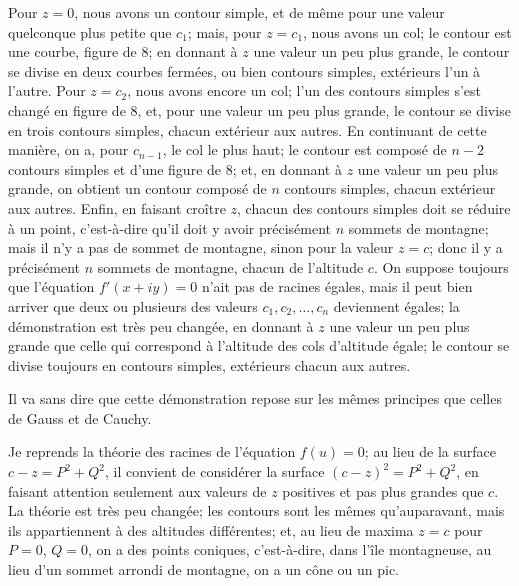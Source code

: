 \documentclass[11pt,a4paper]{article}
\begin{document}
Pour $z = 0$, nous avons un contour simple, et de même pour une valeur quelconque plus petite que $c_1$; mais, pour $z = c_1$, nous avons un col; le contour est une courbe, figure de 8; en donnant à $z$ une valeur un peu plus grande, le contour se divise en deux courbes fermées, ou bien contours simples, extérieurs l'un à l'autre. Pour $z = c_2$, nous avons encore un col; l'un des contours simples s'est changé en figure de 8, et, pour une valeur un peu plus grande, le contour se divise en trois contours simples, chacun extérieur aux autres. En continuant de cette manière, on a, pour $c_{n-1}$, le col le plus haut; le contour est composé de $n - 2$ contours simples et d'une figure de 8; et, en donnant à $z$ une valeur un peu plus grande, on obtient un contour composé de $n$ contours simples, chacun extérieur aux autres. Enfin, en faisant croître $z$, chacun des contours simples doit se réduire à un point, c'est-à-dire qu'il doit y avoir précisément $n$ sommets de montagne; mais il n'y a pas de sommet de montagne, sinon pour la valeur $z = c$; donc il y a précisément $n$ sommets de montagne, chacun de l'altitude $c$. On suppose toujours que l'équation $f'(x + iy) = 0$ n'ait pas de racines égales, mais il peut bien arriver que deux ou plusieurs des valeurs $c_1, c_2, \ldots, c_n$ deviennent égales; la démonstration est très peu changée, en donnant à $z$ une valeur un peu plus grande que celle qui correspond à l'altitude des cols d'altitude égale; le contour se divise toujours en contours simples, extérieurs chacun aux autres.

Il va sans dire que cette démonstration repose sur les mêmes principes que celles de Gauss et de Cauchy.

\bigskip

Je reprends la théorie des racines de l'équation $f(u) = 0$; au lieu de la surface $c - z = P^2 + Q^2$, il convient de considérer la surface $(c - z)^2 = P^2 + Q^2$, en faisant attention seulement aux valeurs de $z$ positives et pas plus grandes que $c$. La théorie est très peu changée; les contours sont les mêmes qu'auparavant, mais ils appartiennent à des altitudes différentes; et, au lieu de maxima $z = c$ pour $P = 0$, $Q = 0$, on a des points coniques, c'est-à-dire, dans l'île montagneuse, au lieu d'un sommet arrondi de montagne, on a un cône ou un pic.
\end{document}
